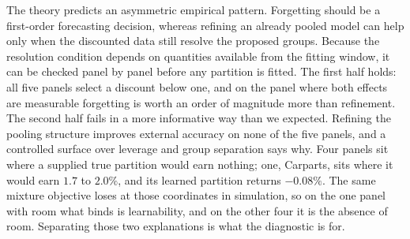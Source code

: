 \documentclass[twocolumn,10pt]{article}
\theoremstyle{definition}
\begin{document}
The theory predicts an asymmetric empirical pattern. Forgetting should be
a first-order forecasting decision, whereas refining an already pooled
model can help only when the discounted data still resolve the proposed
groups. Because the resolution condition depends on quantities available
from the fitting window, it can be checked panel by panel before any
partition is fitted. The first half holds: all five panels select a
discount below one, and on the panel where both effects are measurable
forgetting is worth an order of magnitude more than refinement. The second
half fails in a more informative way than we expected. Refining the
pooling structure improves external accuracy on none of the five panels,
and a controlled surface over leverage and group separation says why.
Four panels sit where a supplied true partition would earn nothing; one,
Carparts, sits where it would earn $1.7$ to $2.0\%$, and its learned
partition returns $-0.08\%$. The same mixture objective loses at those
coordinates in simulation, so on the one panel with room what binds is
learnability, and on the other four it is the absence of room. Separating
those two explanations is what the diagnostic is for.
\end{document}
